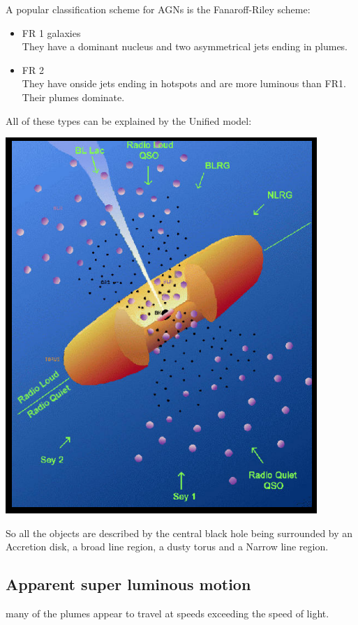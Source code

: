 \documentclass[11pt,a4paper]{article}
\begin{document}
A popular classification scheme for AGNs is the Fanaroff-Riley scheme:
\begin{itemize}
\item FR 1 galaxies  \\
    They have a dominant nucleus and two asymmetrical jets ending in plumes.
\item FR 2 \\ 
    They have onside jets ending in hotspots and are more luminous than FR1. 
    Their plumes dominate.
\end{itemize}
All of these types can be explained by the Unified model: 

\begin{center}
    \includegraphics[width=0.6\linewidth]{screenshot_2024-01-26-154109.png}
\end{center}
So all the objects are described by the central black hole being surrounded by an Accretion disk, a broad line region, a dusty torus and a Narrow line region.

\subsection{Apparent super luminous motion}
many of the plumes appear to travel at speeds exceeding the speed of light.
\end{document}
